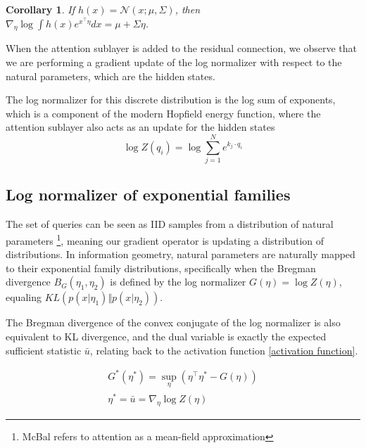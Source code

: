 \documentclass{article}
\newtheorem{corollary}{Corollary}
\begin{document}
\begin{corollary}
  If $h(x) = \mathcal{N}( x; \mu,\Sigma)$, then \\
  $\nabla_\eta \log \int h(x) e^{ x^\intercal \eta} dx = \mu + \Sigma \eta$.
  \label{cor gaussian update}
\end{corollary}


When the attention sublayer is added to the residual connection, we observe that we are performing a gradient update of the log normalizer with respect to the natural parameters, which are the hidden states.

The log normalizer for this discrete distribution is the log sum of exponents, which is a component of the modern Hopfield energy function, where the attention sublayer also acts as an update for the hidden states
\begin{equation}
  \log Z(q_i) = \log \sum_{j=1}^N e^{ k_j \cdot q_i}
  \label{free energy}
\end{equation}




\subsection{Log normalizer of exponential families}

The set of queries can be seen as IID samples from a distribution of natural parameters \footnote{McBal refers to attention as a mean-field approximation}, meaning our gradient operator is updating a distribution of distributions. In information geometry, natural parameters are naturally mapped to their exponential family distributions, specifically when the Bregman divergence $B_G(\eta_1,\eta_2)$ is defined by the log normalizer $G(\eta) = \log Z(\eta)$, equaling $KL \left( p(x \vert \eta_1) \Vert p(x \vert \eta_2) \right)$. 

The Bregman divergence of the convex conjugate of the log normalizer is also equivalent to KL divergence, and the dual variable is exactly the expected sufficient statistic $\bar{u}$, relating back to the activation function \eqref{activation function}.

\begin{equation}
  \begin{split}
    G^*(\eta^*) = \sup_\eta \left( \eta^\intercal \eta^* - G(\eta) \right)\\
    \eta^* = \bar{u} = \nabla_\eta \log Z(\eta)
  \end{split}
  \label{Fenchel duality}
\end{equation}
\end{document}
